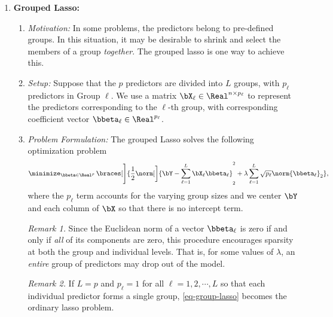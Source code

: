 \documentclass[12pt]{article}
\begin{document}
\begin{enumerate}[label=\textbf{\arabic*.}]
	\item \textbf{Grouped Lasso:} 
	\begin{enumerate}
		\item \textit{Motivation:} In some problems, the predictors belong to pre-defined groups. In this situation, it may be desirable to shrink and select the members of a group \emph{together}. The grouped lasso is one way to achieve this. 
		\item \textit{Setup:} Suppose that the $p$ predictors are divided into $L$ groups, with $p_{\ell}$ predictors in Group ${\ell}$. We use a matrix $\bX_{\ell} \in \Real^{n \times p_{\ell}}$ to represent the predictors corresponding to the ${\ell}$-th group, with corresponding coefficient vector $\bbeta_{\ell} \in \Real^{p_{\ell}}$. 
		\item \textit{Problem Formulation:} The grouped Lasso solves the following optimization problem 
		\begin{align}\label{eq-group-lasso}
			\minimize_{\bbeta \in \Real^{p}} \, \braces[\Bigg]{\frac{1}{2} \norm[\bigg]{\bY - \sum_{{\ell}=1}^L \bX_{{\ell}} \bbeta_{\ell} }_2^2 + \lambda \sum_{\ell=1}^L \sqrt{p_{\ell}} \norm{\bbeta_{\ell}}_2 }, 
		\end{align}
		where the $p_{\ell}$ term accounts for the varying group sizes and we center $\bY$ and each column of $\bX$ so that there is no intercept term. 
		
		\textit{Remark 1.} Since the Euclidean norm of a vector $\bbeta_{\ell}$ is zero if and only if \emph{all} of its components are zero, this procedure encourages sparsity at both the group and individual levels. That is, for some values of $\lambda$, an \emph{entire} group of predictors may drop out of the model. 
		
		\textit{Remark 2.} If $L = p$ and $p_{\ell} = 1$ for all $\ell = 1, 2, \cdots, L$ so that each individual predictor forms a single group, \eqref{eq-group-lasso} becomes the ordinary lasso problem. 
		

\end{enumerate}
\end{enumerate}
\end{document}
